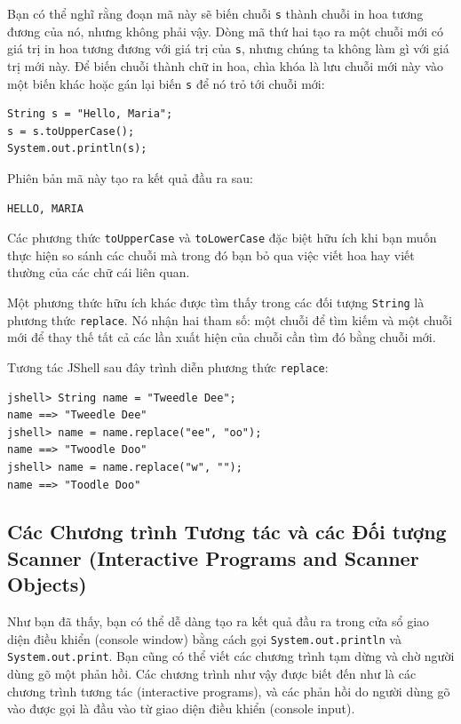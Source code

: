 Bạn có thể nghĩ rằng đoạn mã này sẽ biến chuỗi \texttt{s} thành chuỗi in
hoa tương đương của nó, nhưng không phải vậy. Dòng mã thứ hai tạo ra một
chuỗi mới có giá trị in hoa tương đương với giá trị của \texttt{s},
nhưng chúng ta không làm gì với giá trị mới này. Để biến chuỗi thành chữ
in hoa, chìa khóa là lưu chuỗi mới này vào một biến khác hoặc gán lại
biến \texttt{s} để nó trỏ tới chuỗi mới:

\begin{verbatim}
String s = "Hello, Maria";
s = s.toUpperCase();
System.out.println(s);
\end{verbatim}

Phiên bản mã này tạo ra kết quả đầu ra sau:

\begin{verbatim}
HELLO, MARIA
\end{verbatim}

Các phương thức \texttt{toUpperCase} và \texttt{toLowerCase} đặc biệt
hữu ích khi bạn muốn thực hiện so sánh các chuỗi mà trong đó bạn bỏ qua
việc viết hoa hay viết thường của các chữ cái liên quan.

Một phương thức hữu ích khác được tìm thấy trong các đối tượng
\texttt{String} là phương thức \texttt{replace}. Nó nhận hai tham số:
một chuỗi để tìm kiếm và một chuỗi mới để thay thế tất cả các lần xuất
hiện của chuỗi cần tìm đó bằng chuỗi mới.

Tương tác JShell sau đây trình diễn phương thức \texttt{replace}:

\begin{verbatim}
jshell> String name = "Tweedle Dee";
name ==> "Tweedle Dee"
jshell> name = name.replace("ee", "oo");
name ==> "Twoodle Doo"
jshell> name = name.replace("w", "");
name ==> "Toodle Doo"
\end{verbatim}

\subsection{Các Chương trình Tương tác và các Đối tượng Scanner
(Interactive Programs and Scanner
Objects)}\label{cuxe1c-chux1b0ux1a1ng-truxecnh-tux1b0ux1a1ng-tuxe1c-vuxe0-cuxe1c-ux111ux1ed1i-tux1b0ux1ee3ng-scanner-interactive-programs-and-scanner-objects}

Như bạn đã thấy, bạn có thể dễ dàng tạo ra kết quả đầu ra trong cửa sổ
giao diện điều khiển (console window) bằng cách gọi
\texttt{System.out.println} và \texttt{System.out.print}. Bạn cũng có
thể viết các chương trình tạm dừng và chờ người dùng gõ một phản hồi.
Các chương trình như vậy được biết đến như là các chương trình tương tác
(interactive programs), và các phản hồi do người dùng gõ vào được gọi là
đầu vào từ giao diện điều khiển (console input).


